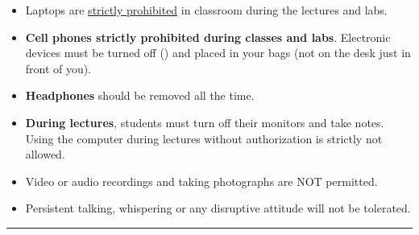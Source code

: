 \documentclass[11pt, a4paper]{article}
\begin{document}
 \clearpage
{} 
\begin{itemize}[itemsep=2.5pt,parsep=0pt,topsep=8pt,partopsep=4pt]
	\item[{ \color{darkblue} \faLaptop}] Laptops are \underline{strictly prohibited} in classroom during the lectures and labs. 
	
	\item[{\huge \color{darkblue} \faMobile}] 
	\textbf{Cell phones strictly prohibited during classes and labs}. Electronic devices must be turned off (\faBellSlashO) and placed in your bags (not on the desk just in front of you). 
	\item[{\large \color{darkblue} \faHeadphones}] 
	\textbf{Headphones} should be removed all the time.            
	\item[{\color{darkblue} \faEdit}] \textbf{During lectures}, students must turn off their monitors and take notes. Using the computer during lectures without authorization is strictly not allowed. 
	\item[{\color{darkblue} \faMicrophoneSlash}] 
	Video or audio recordings and taking photographs are NOT permitted. 
	\item[{\color{darkblue} \faWechat}] 
	Persistent talking, whispering or any disruptive attitude will not be tolerated.
\end{itemize}

\vspace{0.5cm}
\hrule 
\vspbpara 
 
\end{document}
